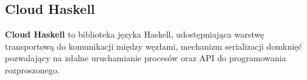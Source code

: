 \subsection{Cloud Haskell}
\label{ssec:cloudHs}
\textbf{Cloud Haskell} to biblioteka języka Haskell, udostępniająca warstwę transportową do komunikacji między węzłami, mechanizm serializacji domknięć pozwalający na zdalne uruchamianie procesów oraz API do programowania rozproszonego.

















